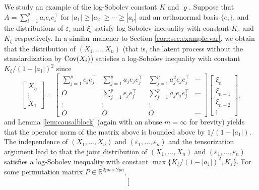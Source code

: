 \documentclass[11pt,a4paper]{article}
\theoremstyle{remark}
\theoremstyle{definition}
\newcommand{\bX}{X}
\newcommand{\be}{e}
\newcommand{\bvarepsilon}{\varepsilon}
\newcommand{\bxi}{\xi}
\newcommand{\bfA}{A}
\newcommand{\bfO}{O}
\newcommand{\bfP}{P}
\newcommand{\R}{\mathbb{R}}
\newcommand{\Cov}{\textnormal{Cov}}
\theoremstyle{definition}
\begin{document}
\begin{bibunit}[apalike]
We study an example of the log-Sobolev constant $K$ and $\varrho$.
Suppose that $\bfA=\sum_{i=1}^{p}a_{i}\be_{i}\be_{i}^{\top}$ for $|a_{1}|\ge |a_{2}|\ge \cdots\ge |a_{p}|$ and an orthonormal basis $\{\be_{i}\}$, and the distributions of $\bvarepsilon_{i}$ and $\bxi_{i}$ satisfy log-Sobolev inequality with constant $K_{\bvarepsilon}$ and $K_{\bxi}$ respectively.
In a similar manener to Section \ref{corr:sec:example:var}, we obtain that the distribution of $(\bX_{1},\ldots,\bX_{n})$ (that is, the latent process without the standardization by $\Cov(\bX_{i})$) satisfies a log-Sobolev inequality with constant $K_{\bxi}/(1-|a_{1}|)^{2}$ since
\begin{equation*}
    \left[\begin{matrix}
        \bX_{n}\\
        \vdots\\
        \bX_{1}
    \end{matrix}\right]
    =
    \left[\begin{matrix}
        \sum_{j=1}^{p}\be_{j}\be_{j}^{\top} & \sum_{j=1}^{p}a_{j}\be_{j}\be_{j}^{\top} & \sum_{j=1}^{p}a_{j}^{2}\be_{j}\be_{j}^{\top} & \cdots \\
        \bfO & \sum_{j=1}^{p}\be_{j}\be_{j}^{\top} & \sum_{j=1}^{p}a_{j}\be_{j}\be_{j}^{\top} &  \cdots \\
        \vdots & \vdots & \vdots & \\
        \bfO & \bfO & \bfO & \cdots
    \end{matrix}\right]
    \left[\begin{matrix}
        \bxi_{n}\\
        \bxi_{n-1}\\
        \bxi_{n-2}\\
        \vdots
    \end{matrix}\right],
\end{equation*}
and Lemma \ref{lem:causalblock} (again with an abuse $m=\infty$ for brevity) yields that the operator norm of the matrix above is bounded above by $1/(1-|a_{1}|)$.
The independence of $(\bX_{1},\ldots,\bX_{n})$ and $(\bvarepsilon_{1},\ldots,\bvarepsilon_{n})$ and the tensorization argument \citep{bakry2014analysis} lead to that the joint distribution of $(\bX_{1},\ldots,\bX_{n})$ and $(\bvarepsilon_{1},\ldots,\bvarepsilon_{n})$ satisfies a log-Sobolev inequality with constant $\max\{K_{\bxi}/(1-|a_{1}|)^{2},K_{\bvarepsilon}\}$.
For some permutation matrix $\bfP\in\R^{2pn\times2pn}$,
\begin{align*}
    \left[\begin{matrix}

\end{matrix}
\end{align*}
\end{bibunit}
\end{document}
